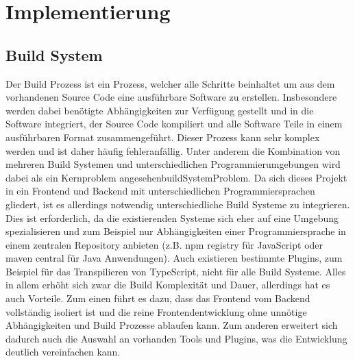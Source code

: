 \chapter{Implementierung}

\section{Build System}
Der Build Prozess ist ein Prozess, welcher alle Schritte beinhaltet um aus dem vorhandenen Source Code eine ausführbare Software zu erstellen. Insbesondere werden dabei benötigte Abhängigkeiten zur Verfügung gestellt und in die Software integriert, der Source Code kompiliert und alle Software Teile in einem ausführbaren Format zusammengeführt. Dieser Prozess kann sehr komplex werden und ist daher häufig fehleranfällig. Unter anderem die Kombination von mehreren Build Systemen und unterschiedlichen Programmierumgebungen wird dabei als ein Kernproblem angesehen\citep{buildSystemProblem}{buildSystemProblem}. Da sich dieses Projekt in ein Frontend und Backend mit unterschiedlichen Programmiersprachen gliedert, ist es allerdings notwendig unterschiedliche Build Systeme zu integrieren. Dies ist erforderlich, da die existierenden Systeme sich eher auf eine Umgebung spezialisieren und zum Beispiel nur Abhängigkeiten einer Programmiersprache in einem zentralen Repository anbieten (z.B. npm registry für JavaScript oder maven central für Java Anwendungen). Auch existieren bestimmte Plugins, zum Beispiel für das Transpilieren von TypeScript, nicht für alle Build Systeme. Alles in allem erhöht sich zwar die Build Komplexität und Dauer, allerdings hat es auch Vorteile. Zum einen führt es dazu, dass das Frontend vom Backend vollständig isoliert ist und die reine Frontendentwicklung ohne unnötige Abhängigkeiten und Build Prozesse ablaufen kann. Zum anderen erweitert sich dadurch auch die Auswahl an vorhanden Tools und Plugins, was die Entwicklung deutlich vereinfachen kann.

